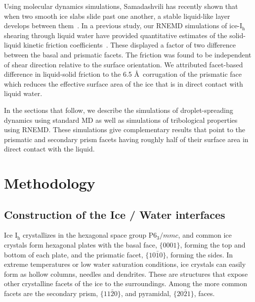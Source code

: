 
Using molecular dynamics simulations, Samadashvili has recently shown
that when two smooth ice slabs slide past one another, a stable
liquid-like layer develops between them~\cite{Samadashvili13}. In a
previous study, our RNEMD simulations of ice-I$_\mathrm{h}$ shearing
through liquid water have provided quantitative estimates of the
solid-liquid kinetic friction coefficients~\cite{Louden13}. These
displayed a factor of two difference between the basal and prismatic
facets.  The friction was found to be independent of shear direction
relative to the surface orientation.  We attributed facet-based
difference in liquid-solid friction to the 6.5 \AA\ corrugation of the
prismatic face which reduces the effective surface area of the ice
that is in direct contact with liquid water.

In the sections that follow, we describe the simulations of
droplet-spreading dynamics using standard MD as well as simulations of
tribological properties using RNEMD.  These simulations give
complementary results that point to the prismatic and secondary prism
facets having roughly half of their surface area in direct contact
with the liquid.

\section{Methodology}
\subsection{Construction of the Ice / Water interfaces}
Ice I$_\mathrm{h}$ crystallizes in the hexagonal space group
P$6_3/mmc$, and common ice crystals form hexagonal plates with the
basal face, $\{0001\}$, forming the top and bottom of each plate, and
the prismatic facet, $\{10\bar{1}0\}$, forming the sides.  In extreme
temperatures or low water saturation conditions, ice crystals can
easily form as hollow columns, needles and dendrites. These are
structures that expose other crystalline facets of the ice to the
surroundings.  Among the more common facets are the secondary prism,
$\{11\bar{2}0\}$, and pyramidal, $\{20\bar{2}1\}$, faces.  

